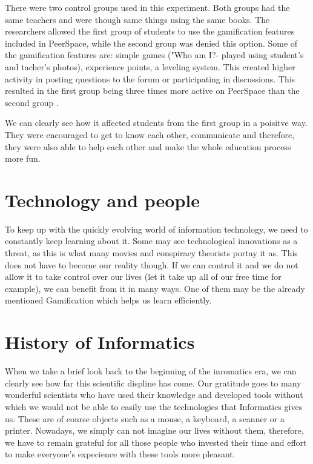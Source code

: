 \documentclass[10pt,english,a4paper]{article}
\begin{document}
	There were two control groups used in this experiment. 
	Both groups had the same teachers and were though same things using the same books.
	The researchers allowed the first group of students to use the gamification features included in PeerSpace, while the second group was denied this option.
	Some of the gamification features are: simple games ("Who am I?- played using student's and tacher's photos), experience points, a leveling system. 
	This created higher activity in posting questions to the forum or participating in discussions. 
	This resulted in the first group being three times more active on PeerSpace than the second group \cite{Li}. 
	
	We can clearly see how it affected students from the first group in a poisitve way. 
	They were encouraged to get to know each other, communicate and therefore, they were also able to help each other and make the whole education process more fun.

\section{Technology and people} \label{Technologia a ludia}
	To keep up with the quickly evolving world of information technology, we need to constantly keep learning about it.
	Some may see technological innovations as a threat, as this is what many movies and conspiracy theorists portay it as. 
	This does not have to become our reality though. 
	If we can control it and we do not allow it to take control over our lives (let it take up all of our free time for example), we can benefit from it in many ways. 
	One of them may be the already mentioned Gamification which helps us learn efficiently. 

\section{History of Informatics} \label{Historia informatiky}
	When we take a brief look back to the beginning of the inromatics era, we can clearly see how far this scientific displine has come. 
	Our gratitude goes to many wonderful scientists who have used their knowledge and developed tools without which we would not be able to easily use the technologies that Informatics gives us.
	These are of course objects such as a mouse, a keyboard, a scanner or a printer. 
	Nowadays, we simply can not imagine our lives without them, therefore, we have to remain grateful for all those people who invested their time and effort to make everyone's expecience with these tools more pleasant.
\end{document}
